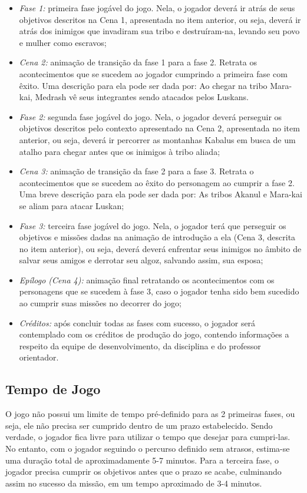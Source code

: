 \begin{itemize}
\item \textit{Fase 1:} primeira fase jogável do jogo. Nela, o jogador deverá ir atrás de seus objetivos descritos na Cena 1, apresentada no item anterior, ou seja, deverá ir atrás dos inimigos que invadiram sua tribo e destruíram-na, levando seu povo e mulher como escravos;
\item \textit{Cena 2:} animação de transição da fase 1 para a fase 2. Retrata os acontecimentos que se sucedem ao jogador cumprindo a primeira fase com êxito. Uma descrição para ela pode ser dada por: Ao chegar na tribo Mara-kai, Medrash vê seus integrantes sendo atacados pelos Luskans.
\item \textit{Fase 2:} segunda fase jogável do jogo. Nela, o jogador deverá perseguir os objetivos descritos pelo contexto apresentado na Cena 2, apresentada no item anterior, ou seja, deverá ir percorrer as montanhas Kabalus em busca de um atalho para chegar antes que os inimigos à tribo aliada;
\item \textit{Cena 3:} animação de transição da fase 2 para a fase 3. Retrata o acontecimentos que se sucedem ao êxito do personagem ao cumprir a fase 2. Uma breve descrição para ela pode ser dada por: As tribos Akanul e Mara-kai se aliam para atacar Luskan;
\item \textit{Fase 3:} terceira fase jogável do jogo. Nela, o jogador terá que perseguir os objetivos e missões dadas na animação de introdução a ela (Cena 3, descrita no item anterior), ou seja, deverá deverá enfrentar seus inimigos no âmbito de salvar seus amigos e derrotar seu algoz, salvando assim, sua esposa;
\item \textit{Epílogo (Cena 4):} animação final retratando os acontecimentos com os personagens que se sucedem à fase 3, caso o jogador tenha sido bem sucedido ao cumprir suas missões no decorrer do jogo;
\item \textit{Créditos:} após concluir todas as fases com sucesso, o jogador será contemplado com os créditos de produção do jogo, contendo informações a respeito  da equipe de desenvolvimento, da disciplina e do professor orientador.
\end{itemize}

\subsection{Tempo de Jogo}
O jogo não possui um limite de tempo pré-definido para as 2 primeiras fases, ou seja, ele não precisa ser cumprido dentro de um prazo estabelecido. Sendo verdade, o jogador fica livre para utilizar o tempo que desejar para cumpri-las. No entanto, com o jogador seguindo o percurso definido sem atrasos, estima-se uma duração total de aproximadamente 5-7 minutos. Para a terceira fase, o jogador precisa cumprir os objetivos antes que o prazo se acabe, culminando assim no sucesso da missão, em um tempo aproximado de 3-4 minutos.


